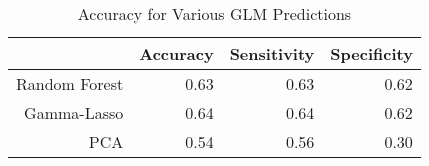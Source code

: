 \begin{table}[ht]
\centering
\caption{Accuracy for Various GLM Predictions} 
\label{tab:glm_accuracy}
\begin{tabular}{rrrr}
  \hline
 & Accuracy & Sensitivity & Specificity \\ 
  \hline
Random Forest & 0.63 & 0.63 & 0.62 \\ 
  Gamma-Lasso & 0.64 & 0.64 & 0.62 \\ 
  PCA & 0.54 & 0.56 & 0.30 \\ 
   \hline
\end{tabular}
\end{table}
